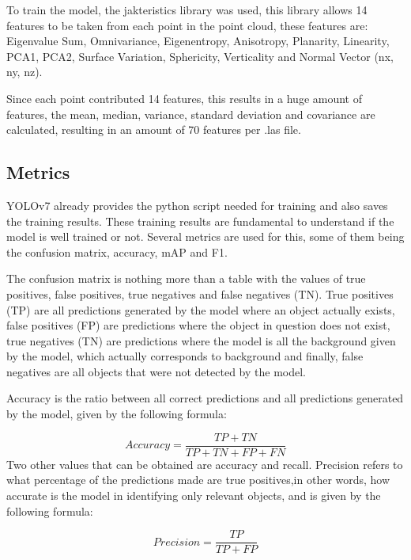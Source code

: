 To train the model, the jakteristics library was used, this library allows 14 features to be taken from each point in the point cloud, these features are: Eigenvalue Sum, Omnivariance, Eigenentropy, Anisotropy, Planarity, Linearity, PCA1, PCA2, Surface Variation, Sphericity, Verticality and Normal Vector (nx, ny, nz).

Since each point contributed 14 features, this results in a huge amount of features, the mean, median, variance, standard deviation and covariance are calculated, resulting in an amount of 70 features per .las file.



\subsection{Metrics}

YOLOv7 already provides the python script needed for training and also saves the training results. These training results are fundamental to understand if the model is well trained or not. Several metrics are used for this, some of them being the confusion matrix, accuracy, mAP and F1.

The confusion matrix is nothing more than a table with the values of true positives, false positives, true negatives and false negatives (TN). True positives (TP) are all predictions generated by the model where an object actually exists, false positives (FP) are predictions where the object in question does not exist, true negatives (TN) are predictions where the model is all the background given by the model, which actually corresponds to background and finally, false negatives are all objects that were not detected by the model.

Accuracy is the ratio between all correct predictions and all predictions generated by the model, given by the following formula:

\begin{equation}
     Accuracy = \frac{TP + TN}{TP + TN + FP + FN}
\end{equation}
Two other values that can be obtained are accuracy and recall\cite{yoloMetrics}. Precision refers to what percentage of the predictions made are true positives,in other words, how accurate is the model in identifying only relevant objects, and is given by the following formula:

\begin{equation}
     Precision = \frac{TP }{TP + FP}
\end{equation}

